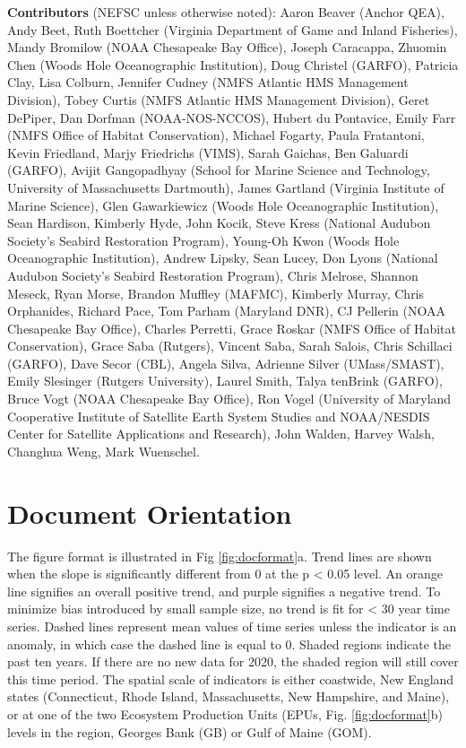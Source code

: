 \documentclass[
  10pt,
]{article}
\begin{document}
\textbf{Contributors} (NEFSC unless otherwise noted): Aaron Beaver (Anchor QEA), Andy Beet, Ruth Boettcher (Virginia Department of Game and Inland Fisheries), Mandy Bromilow (NOAA Chesapeake Bay Office), Joseph Caracappa, Zhuomin Chen (Woods Hole Oceanographic Institution), Doug Christel (GARFO), Patricia Clay, Lisa Colburn, Jennifer Cudney (NMFS Atlantic HMS Management Division), Tobey Curtis (NMFS Atlantic HMS Management Division), Geret DePiper, Dan Dorfman (NOAA-NOS-NCCOS), Hubert du Pontavice, Emily Farr (NMFS Office of Habitat Conservation), Michael Fogarty, Paula Fratantoni, Kevin Friedland, Marjy Friedrichs (VIMS), Sarah Gaichas, Ben Galuardi (GARFO), Avijit Gangopadhyay (School for Marine Science and Technology, University of Massachusetts Dartmouth), James Gartland (Virginia Institute of Marine Science), Glen Gawarkiewicz (Woods Hole Oceanographic Institution), Sean Hardison, Kimberly Hyde, John Kocik, Steve Kress (National Audubon Society's Seabird Restoration Program), Young-Oh Kwon (Woods Hole Oceanographic Institution), Andrew Lipsky, Sean Lucey, Don Lyons (National Audubon Society's Seabird Restoration Program), Chris Melrose, Shannon Meseck, Ryan Morse, Brandon Muffley (MAFMC), Kimberly Murray, Chris Orphanides, Richard Pace, Tom Parham (Maryland DNR), CJ Pellerin (NOAA Chesapeake Bay Office), Charles Perretti, Grace Roskar (NMFS Office of Habitat Conservation), Grace Saba (Rutgers), Vincent Saba, Sarah Salois, Chris Schillaci (GARFO), Dave Secor (CBL), Angela Silva, Adrienne Silver (UMass/SMAST), Emily Slesinger (Rutgers University), Laurel Smith, Talya tenBrink (GARFO), Bruce Vogt (NOAA Chesapeake Bay Office), Ron Vogel (University of Maryland Cooperative Institute of Satellite Earth System Studies and NOAA/NESDIS Center for Satellite Applications and Research), John Walden, Harvey Walsh, Changhua Weng, Mark Wuenschel.

\newpage

\hypertarget{document-orientation}{%
\section{Document Orientation}\label{document-orientation}}

The figure format is illustrated in Fig \ref{fig:docformat}a. Trend lines are shown when the slope is significantly different from 0 at the p \textless{} 0.05 level. An orange line signifies an overall positive trend, and purple signifies a negative trend. To minimize bias introduced by small sample size, no trend is fit for \textless{} 30 year time series. Dashed lines represent mean values of time series unless the indicator is an anomaly, in which case the dashed line is equal to 0. Shaded regions indicate the past ten years. If there are no new data for 2020, the shaded region will still cover this time period. The spatial scale of indicators is either coastwide, New England states (Connecticut, Rhode Island, Massachusetts, New Hampshire, and Maine), or at one of the two Ecosystem Production Units (EPUs, Fig. \ref{fig:docformat}b) levels in the region, Georges Bank (GB) or Gulf of Maine (GOM).
\end{document}
